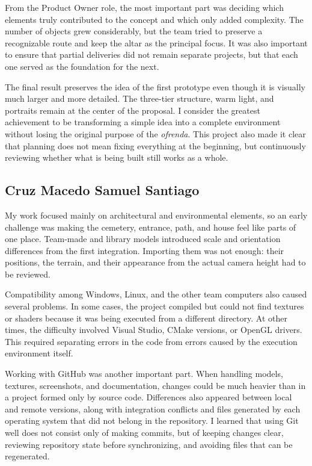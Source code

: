 \documentclass[letter,12pt]{article}
\begin{document}
	From the Product Owner role, the most important part was deciding which elements truly contributed to the concept and which only added complexity. The number of objects grew considerably, but the team tried to preserve a recognizable route and keep the altar as the principal focus. It was also important to ensure that partial deliveries did not remain separate projects, but that each one served as the foundation for the next.

	The final result preserves the idea of the first prototype even though it is visually much larger and more detailed. The three-tier structure, warm light, and portraits remain at the center of the proposal. I consider the greatest achievement to be transforming a simple idea into a complete environment without losing the original purpose of the \textit{ofrenda}. This project also made it clear that planning does not mean fixing everything at the beginning, but continuously reviewing whether what is being built still works as a whole.

	\subsection*{Cruz Macedo Samuel Santiago}
	My work focused mainly on architectural and environmental elements, so an early challenge was making the cemetery, entrance, path, and house feel like parts of one place. Team-made and library models introduced scale and orientation differences from the first integration. Importing them was not enough: their positions, the terrain, and their appearance from the actual camera height had to be reviewed.

	Compatibility among Windows, Linux, and the other team computers also caused several problems. In some cases, the project compiled but could not find textures or shaders because it was being executed from a different directory. At other times, the difficulty involved Visual Studio, CMake versions, or OpenGL drivers. This required separating errors in the code from errors caused by the execution environment itself.

	Working with GitHub was another important part. When handling models, textures, screenshots, and documentation, changes could be much heavier than in a project formed only by source code. Differences also appeared between local and remote versions, along with integration conflicts and files generated by each operating system that did not belong in the repository. I learned that using Git well does not consist only of making commits, but of keeping changes clear, reviewing repository state before synchronizing, and avoiding files that can be regenerated.
\end{document}
